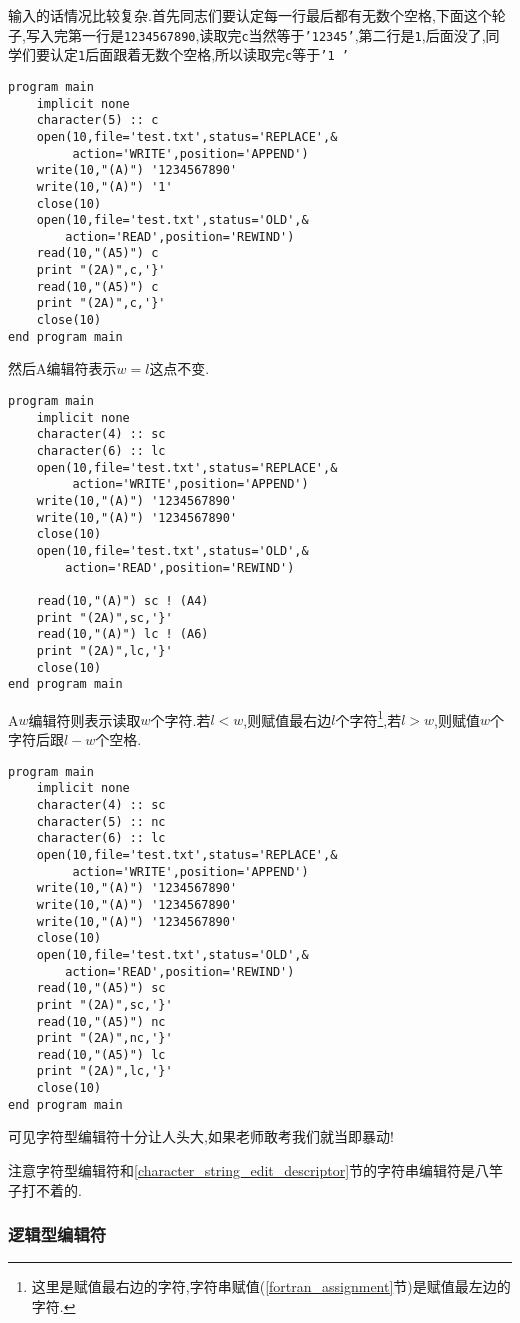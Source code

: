 输入的话情况比较复杂.首先同志们要认定每一行最后都有无数个空格,下面这个轮子,写入完第一行是\texttt{1234567890},读取完\texttt{c}当然等于\texttt{'12345'},第二行是\texttt{1},后面没了,同学们要认定\texttt{1}后面跟着无数个空格,所以读取完\texttt{c}等于\texttt{'1    '}
\begin{lstlisting}
program main
    implicit none
    character(5) :: c
    open(10,file='test.txt',status='REPLACE',&
         action='WRITE',position='APPEND')
    write(10,"(A)") '1234567890'
    write(10,"(A)") '1'
    close(10)
    open(10,file='test.txt',status='OLD',&
        action='READ',position='REWIND')
    read(10,"(A5)") c
    print "(2A)",c,'}'
    read(10,"(A5)") c
    print "(2A)",c,'}'
    close(10)
end program main
\end{lstlisting}
然后A编辑符表示$w=l$这点不变.
\begin{lstlisting}
program main
    implicit none
    character(4) :: sc
    character(6) :: lc
    open(10,file='test.txt',status='REPLACE',&
         action='WRITE',position='APPEND')
    write(10,"(A)") '1234567890'
    write(10,"(A)") '1234567890'
    close(10)
    open(10,file='test.txt',status='OLD',&
        action='READ',position='REWIND')

    read(10,"(A)") sc ! (A4)
    print "(2A)",sc,'}'
    read(10,"(A)") lc ! (A6)
    print "(2A)",lc,'}'
    close(10)
end program main
\end{lstlisting}
A$w$编辑符则表示读取$w$个字符.若$l<w$,则赋值最右边$l$个字符\footnote{这里是赋值最右边的字符,字符串赋值(\ref{fortran_assignment}节)是赋值最左边的字符.},若$l>w$,则赋值$w$个字符后跟$l-w$个空格.
\begin{lstlisting}
program main
    implicit none
    character(4) :: sc
    character(5) :: nc
    character(6) :: lc
    open(10,file='test.txt',status='REPLACE',&
         action='WRITE',position='APPEND')
    write(10,"(A)") '1234567890'
    write(10,"(A)") '1234567890'
    write(10,"(A)") '1234567890'
    close(10)
    open(10,file='test.txt',status='OLD',&
        action='READ',position='REWIND')
    read(10,"(A5)") sc
    print "(2A)",sc,'}'
    read(10,"(A5)") nc
    print "(2A)",nc,'}'
    read(10,"(A5)") lc
    print "(2A)",lc,'}'
    close(10)
end program main
\end{lstlisting}

可见字符型编辑符十分让人头大,如果老师敢考我们就当即暴动!

注意字符型编辑符和\ref{character_string_edit_descriptor}节的字符串编辑符是八竿子打不着的.

\subsubsection{逻辑型编辑符}

